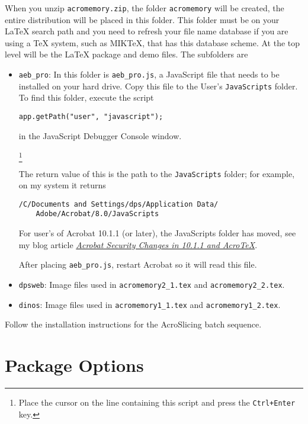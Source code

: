 \documentclass{article}
\def\nhfootnote#1{\begin{NoHyper}\footnote{#1}\end{NoHyper}}
\begin{document}
\newtopic When you unzip \texttt{acromemory.zip}, the folder
\texttt{acromemory} will be created, the entire distribution will be
placed in this folder. This folder must be on your {\LaTeX} search
path and you need to refresh your file name database if you are
using a {\TeX} system, such as MIK\TeX, that has this database
scheme. At the top level will be the {\LaTeX} package and demo
files. The subfolders are
\begin{itemize}
    \item \texttt{aeb\_pro}: In this folder is \texttt{aeb\_pro.js}, a
        JavaScript file that needs to be installed on your hard drive.
        Copy this file to the User's
            \texttt{JavaScripts} folder. To find this folder, execute the
            script
\begin{Verbatim}[xleftmargin=20pt,fontsize=\fontsize{9}{11}\selectfont]
app.getPath("user", "javascript");
\end{Verbatim}
in the JavaScript Debugger Console window.\nhfootnote{Place the cursor
on the line containing this script and press the \texttt{Ctrl+Enter}
key.} The return value of this is the path to the
\texttt{JavaScripts} folder; for example, on my system it returns
\begin{Verbatim}[xleftmargin=20pt,fontsize=\fontsize{9}{11}\selectfont]
/C/Documents and Settings/dps/Application Data/
    Adobe/Acrobat/8.0/JavaScripts
\end{Verbatim}
For user's of Acrobat 10.1.1 (or later), the JavaScripts folder has moved,
see my blog article \textsl{\href{http://www.acrotex.net/blog/?p=737}{Acrobat Security Changes in 10.1.1 and
Acro\!\TeX}}.

After placing \texttt{aeb\_pro.js}, restart Acrobat so it will read this file.
    \item \texttt{dpsweb}: Image files used in \texttt{acromemory2\_1.tex} and \texttt{acromemory2\_2.tex}.
    \item \texttt{dinos}: Image files used in \texttt{acromemory1\_1.tex} and \texttt{acromemory1\_2.tex}.
\end{itemize}

\newtopic Follow the installation instructions for the \textsf{AcroSlicing} batch sequence.

\section{Package Options}
\end{document}
